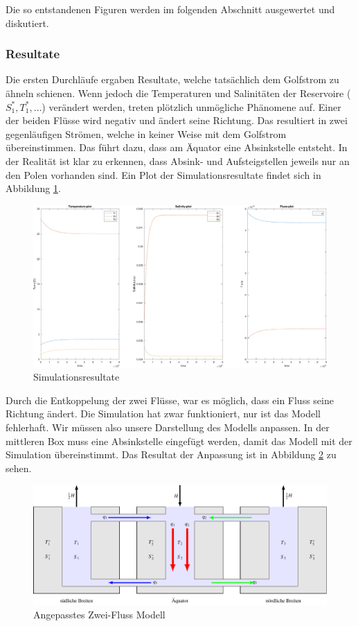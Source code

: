 Die so entstandenen Figuren werden im folgenden Abschnitt ausgewertet und diskutiert. 

\subsubsection{Resultate}
Die ersten Durchläufe ergaben Resultate, welche tatsächlich dem Golfstrom zu ähneln schienen. Wenn jedoch die Temperaturen und Salinitäten der Reservoire ($S_1^*, T_1^*,\dots$) verändert werden, treten plötzlich unmögliche Phänomene auf.
Einer der beiden Flüsse wird negativ und ändert seine Richtung. Das resultiert in zwei gegenläufigen Strömen, welche in keiner Weise mit dem Golfstrom übereinstimmen. Das führt dazu, dass am Äquator eine Absinkstelle entsteht. In der Realität ist klar zu erkennen, dass Absink- und Aufsteigstellen jeweils nur an den Polen vorhanden sind. 
Ein Plot der Simulationsresultate findet sich in Abbildung \ref{thermohalin:simulationsresultate}.

\begin{figure}
	\includegraphics[width=14cm]{thermohalin/Code/graphs/result-3b2f-script.pdf}
	\centering
	\caption{Simulationsresultate}
	\label{thermohalin:simulationsresultate}
\end{figure}

Durch die Entkoppelung der zwei Flüsse, war es möglich, dass ein Fluss seine Richtung ändert.
Die Simulation hat zwar funktioniert, nur ist das Modell fehlerhaft. Wir müssen also unsere Darstellung des Modells anpassen. In der mittleren Box muss eine Absinkstelle eingefügt werden, damit das Modell mit der Simulation übereinstimmt. Das Resultat der Anpassung ist in Abbildung \ref{thermohalin:3b2f-inverted} zu sehen.

\begin{figure}
	\centering
	\includegraphics[width=14cm]{thermohalin/tikz/3b2f-inverted.pdf}
	\caption{Angepasstes Zwei-Fluss Modell}
	\label{thermohalin:3b2f-inverted}
\end{figure}


